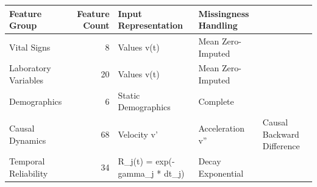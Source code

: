 \begin{tabular}{lrll}
\toprule
Feature Group & Feature Count & Input Representation & Missingness Handling \\
\midrule
Vital Signs & 8 & Values v(t) & Mean Zero-Imputed \\
Laboratory Variables & 20 & Values v(t) & Mean Zero-Imputed \\
Demographics & 6 & Static Demographics & Complete \\
Causal Dynamics & 68 & Velocity v' & Acceleration v'' & Causal Backward Difference \\
Temporal Reliability & 34 & R\_j(t) = exp(-gamma\_j * dt\_j) & Decay Exponential \\
\bottomrule
\end{tabular}
